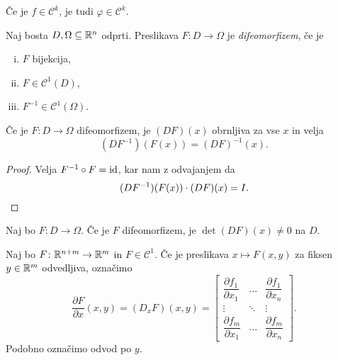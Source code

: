 
\begin{opomba}
Če je $f \in \mathcal{C}^k$, je tudi $\varphi \in \mathcal{C}^k$.
\end{opomba}

\begin{definicija}
Naj bosta $D, \Omega \subseteq \mathbb{R}^n$ odprti. Preslikava
$F \colon D \to \Omega$ je
\emph{difeomorfizem}, če je

\begin{enumerate}[i)]
\item $F$ bijekcija,
\item $F \in \mathcal{C}^1(D)$,
\item $F^{-1} \in \mathcal{C}^1(\Omega)$.
\end{enumerate}
\end{definicija}

\begin{trditev}
Če je $F \colon D \to \Omega$ difeomorfizem, je $(DF)(x)$ obrnljiva
za vse $x$ in velja
\[
(DF^{-1})(F(x)) = (DF)^{-1}(x).
\]
\end{trditev}

\begin{proof}
Velja $F^{-1} \circ F = \operatorname{id}$, kar nam z odvajanjem da
\[
(DF^{-1})(F(x)) \cdot (DF)(x) = I. \qedhere
\]
\end{proof}

\begin{posledica}
Naj bo $F \colon D \to \Omega$. Če je $F$ difeomorfizem, je
$\det(DF)(x) \ne 0$ na $D$.
\end{posledica}

\begin{definicija}
Naj bo $F \colon \mathbb{R}^{n+m} \to \mathbb{R}^m$ in $F \in \mathcal{C}^1$.
Če je preslikava $x \mapsto F(x,y)$ za fiksen $y \in \mathbb{R}^m$
odvedljiva, označimo
\[
\frac{\partial F}{\partial x}(x,y) = (D_x F)(x,y) =
\begin{bmatrix}
\dfrac{\partial f_1}{\partial x_1} &
\dots                             &
\dfrac{\partial f_1}{\partial x_n} \\ 
\vdots                            &
\ddots                            &
\vdots                            \\ 
\dfrac{\partial f_m}{\partial x_1} &
\dots                             &
\dfrac{\partial f_m}{\partial x_n}
\end{bmatrix}.
\]
Podobno označimo odvod po $y$.
\end{definicija}


